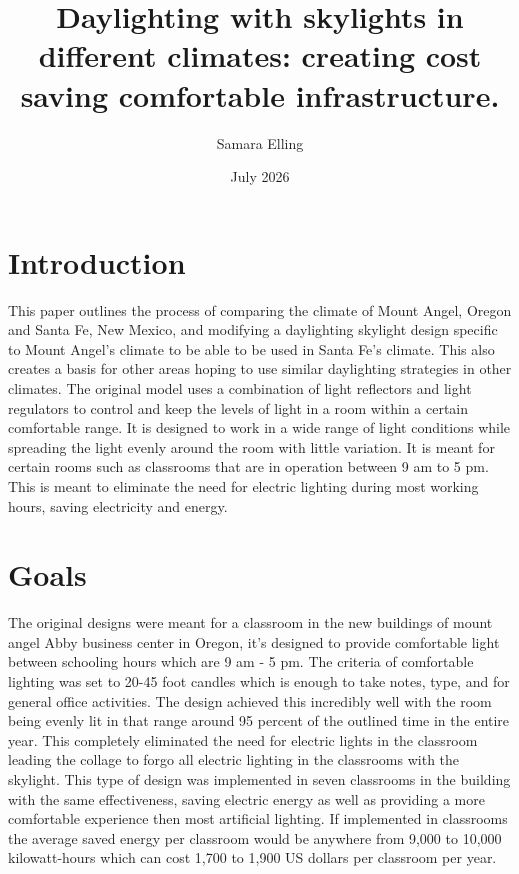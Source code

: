 \documentclass{article}
\title{Daylighting with skylights in different climates: creating cost saving comfortable infrastructure.}
\author{Samara Elling}
\date{July 2026}
\begin{document}
\maketitle

\section{Introduction}

    This paper outlines the process of comparing the climate of Mount Angel, Oregon and Santa Fe, New Mexico, and modifying a daylighting skylight design specific to Mount Angel's climate to be able to be used in Santa Fe's climate. This also creates a basis for other areas hoping to use similar daylighting strategies in other climates. The original model uses a combination of light reflectors and light regulators to control and keep the levels of light in a room within a certain comfortable range. It is designed to work in a wide range of  light conditions while spreading the light evenly around the room with little variation. It is meant for certain rooms such as classrooms that are in operation between 9 am to 5 pm. This is meant to eliminate the need for electric lighting during most working hours, saving electricity and energy. 


\section{Goals}


The original designs were meant for a classroom in the new buildings of mount angel Abby business center in  Oregon, it's designed to provide comfortable light between schooling hours which are 9 am - 5 pm. The criteria of comfortable lighting was set to 20-45 foot candles which is enough to take notes, type, and for general office activities. The design achieved this incredibly well with the room being evenly lit in that range around 95 percent of the outlined time in the entire year. This completely eliminated the need for electric lights in the classroom leading the collage to forgo all electric lighting in the classrooms with the skylight. This type of design was implemented in seven classrooms in the building with the same effectiveness, saving electric energy as well as providing a more comfortable experience then most artificial lighting. If implemented in classrooms the average saved energy per classroom would be anywhere from 9,000 to 10,000 kilowatt-hours which can cost 1,700 to 1,900 US dollars per classroom per year. 
\end{document}
